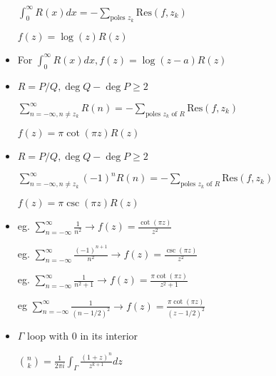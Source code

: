 \documentclass[10pt,a4paper]{article}
\begin{document}
\begin{multicols}{2}
\begin{itemize}
$\displaystyle \int_0^\infty R(x)dx = -\sum_{\text{poles }z_k} \text{Res}(f,z_k)$

$f(z)=\log(z)R(z)$

\item For $\int_0^\infty R(x)dx, f(z)=\log(z-a)R(z)$
\item $R=P/Q, \deg Q-\deg P \geq 2$

$\displaystyle \sum_{n=-\infty, n\neq z_k}^\infty R(n) = -\sum_{\text{poles } z_k \text{ of } R} \text{Res}(f,z_k)$

$f(z)=\pi \cot(\pi z)R(z)$

\item $R=P/Q, \deg Q-\deg P \geq 2$

$\displaystyle \sum_{n=-\infty, n\neq z_k}^\infty (-1)^n R(n) = -\sum_{\text{poles } z_k \text{ of } R} \text{Res}(f,z_k)$

$f(z)=\pi \csc(\pi z)R(z)$


\item eg. $\sum_{n=-\infty}^\infty \frac{1}{n^2} \to f(z)=\frac{\cot(\pi z)}{z^2}$

eg. $\sum_{n=-\infty}^\infty \frac{(-1)^{n+1}}{n^2} \to f(z)=\frac{\csc(\pi z)}{z^2}$

eg. $\sum_{n=-\infty}^\infty \frac{1}{n^2+1} \to f(z)=\frac{\pi \cot(\pi z)}{z^2+1}$

eg $ \sum_{n=-\infty}^\infty \frac{1}{(n-1/2)^2} \to f(z)=\frac{\pi \cot(\pi z)}{(z-1/2)^2}$

\item $\Gamma$ loop with $0$ in its interior 

$\displaystyle \binom{n}{k}=\frac{1}{2\pi i} \int_\Gamma \frac{(1+z)^n}{z^{k+1}}dz$







\end{itemize}

\end{multicols}
\end{document}
